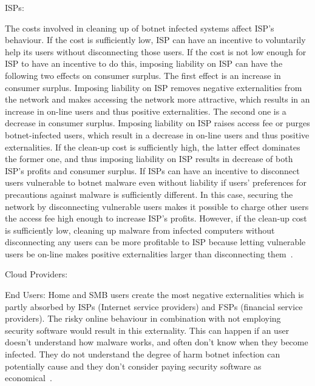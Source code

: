 ISPs:

The costs involved in cleaning up of botnet infected systems affect ISP’s behaviour. If the cost is sufficiently low, ISP can have an incentive to voluntarily help its users without disconnecting those users. If the cost is not low enough for ISP to have an incentive to do this, imposing liability on ISP can have the following two effects on consumer surplus. The first effect is an increase in consumer surplus. Imposing liability on ISP removes negative externalities from the network and makes accessing the network more attractive, which results in an increase in on-line users and thus positive externalities. The second one is a decrease in consumer surplus. Imposing liability on ISP raises access fee or purges botnet-infected users, which result in a decrease in on-line users and thus positive externalities. If the clean-up cost is sufficiently high, the latter effect dominates the former one, and thus imposing liability on ISP results in decrease of both ISP’s profits and consumer surplus. If ISPs can have an incentive to disconnect users vulnerable to botnet malware even without liability if users’ preferences for precautions against malware is sufficiently different. In this case, securing the network by disconnecting vulnerable users makes it possible to charge other users the access fee high enough to increase ISP’s profits. However, if the clean-up cost is sufficiently low, cleaning up malware from infected computers without disconnecting any users can be more profitable to ISP because letting vulnerable users be on-line makes positive externalities larger than disconnecting them~\cite{kinukawa2012should}.

Cloud Providers:



End Users:
Home and SMB users create the most negative externalities which is partly absorbed by ISPs (Internet service providers) and FSPs (financial service providers). The risky online behaviour in combination with not employing security software would result in this externality. This can happen  if an user doesn’t understand how malware works, and often don’t know when they become infected. They do not understand the degree of harm botnet infection can potentially cause and they don't consider paying security software as economical~\cite{asghari2010botnet}. 
